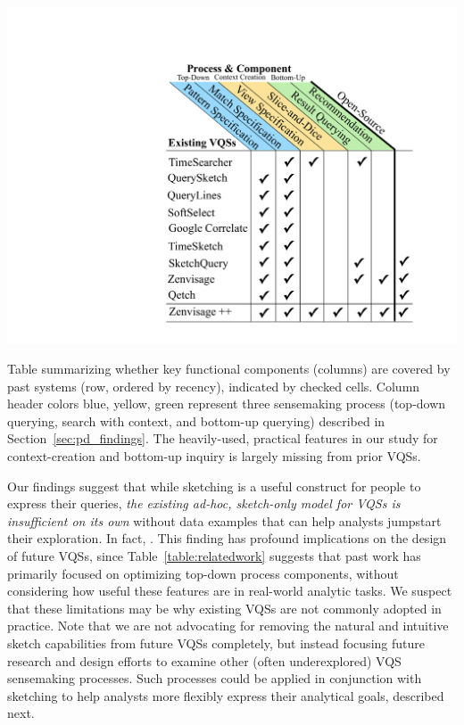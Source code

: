   \begin{table}[ht!]
    \vspace*{-10pt}
     \centering
     \includegraphics[width=0.8\linewidth]{figures/related_works_table.pdf}
     \caption{Table summarizing whether key functional components (columns) are covered by past systems (row, ordered by recency), indicated by checked cells. Column header colors blue, yellow, green represent three sensemaking process (top-down querying, search with context, and bottom-up querying) described in Section~\ref{sec:pd_findings}. The heavily-used, practical features in our study for context-creation and bottom-up inquiry is largely missing from prior VQSs.}
     \label{table:relatedwork}
     \vspace*{-10pt}
  \end{table}
 \par Our findings suggest that while sketching
 is a useful construct for people to express their queries,
 \emph{the existing ad-hoc, sketch-only model for VQSs
 is insufficient on its own} without data examples
 that can help analysts jumpstart their exploration.
 In fact, . This finding has profound implications
 on the design of future VQSs, since Table~\ref{table:relatedwork}
 suggests that past work has primarily focused
 on optimizing top-down process components,
 without considering how useful these features
 are in real-world analytic tasks.
 We suspect that these limitations may be why existing VQSs are not commonly adopted in practice. Note that we are not advocating for removing the natural and intuitive sketch capabilities from future VQSs completely, but instead focusing future research and design efforts to examine other (often underexplored) VQS sensemaking processes. Such processes could be applied in conjunction with sketching to help analysts more flexibly express their analytical goals, described next.

